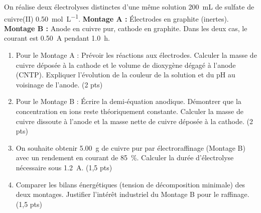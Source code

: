 \documentclass[11pt]{article}
\begin{document}
\begin{exercice}
On réalise deux électrolyses distinctes d'une même solution \SI{200}{mL} de sulfate de cuivre(II)  \SI{0,50}{mol.L^{-1}}.
\textbf{Montage A :} Électrodes en graphite (inertes). \textbf{Montage B :} Anode en cuivre pur, cathode en graphite.
Dans les deux cas, le courant est \SI{0,50}{A} pendant \SI{1,0}{h}.
\begin{enumerate}
    \item Pour le Montage A : Prévoir les réactions aux électrodes. Calculer la masse de cuivre déposée à la cathode et le volume de dioxygène dégagé à l'anode (CNTP). Expliquer l'évolution de la couleur de la solution et du pH au voisinage de l'anode. (2 pts)
    \item Pour le Montage B : Écrire la demi-équation anodique. Démontrer que la concentration en ions  reste théoriquement constante. Calculer la masse de cuivre dissoute à l'anode et la masse nette de cuivre déposée à la cathode. (2 pts)
    \item On souhaite obtenir \SI{5,00}{g} de cuivre pur par électroraffinage (Montage B) avec un rendement en courant de \SI{85}{\%}. Calculer la durée d'électrolyse nécessaire sous \SI{1,2}{A}. (1,5 pts)
    \item Comparer les bilans énergétiques (tension de décomposition minimale) des deux montages. Justifier l'intérêt industriel du Montage B pour le raffinage. (1,5 pts)
\end{enumerate}
\end{exercice}
\end{document}
